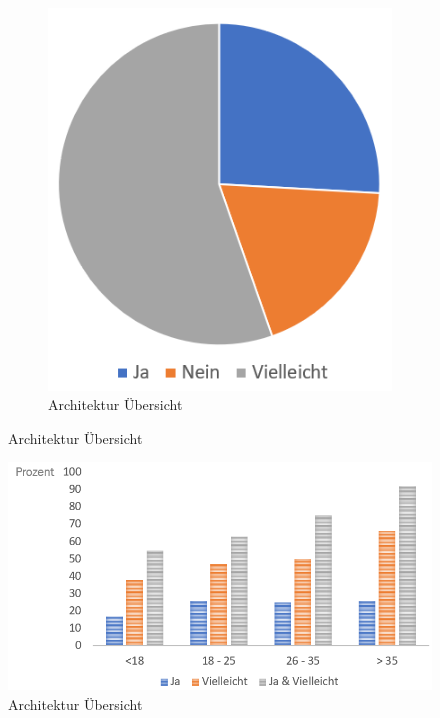 \begin{figure}[ht!]
	\begin{subfigure}{0.45\linewidth}
		\centering
		\includegraphics[width=1\linewidth]{Picture/umfrage_geld}
		\caption[Architektur Übersicht]{Architektur Übersicht}
		\label{fig:umfrage_geld}
	\end{subfigure}
	\caption[Architektur Übersicht]{Architektur Übersicht}
	\label{fig:umfrage_datenschutz_geld}
\end{figure}


\begin{figure}[h!]
	\centering
	\includegraphics[width=0.7\linewidth]{Picture/umfrage_geld_gruppen}
	\caption[Architektur Übersicht]{Architektur Übersicht}
	\label{fig:umfrage_geld_gruppen}
\end{figure}

